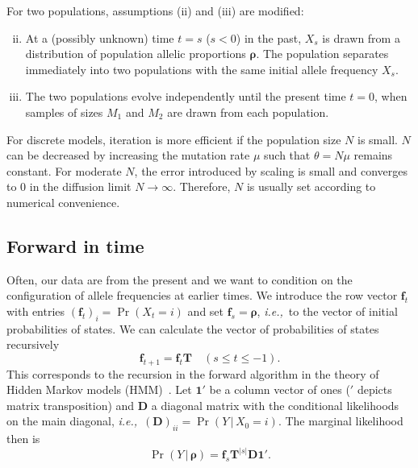 \documentclass[preprint]{elsarticle}
\newcommand{\bs}[1]{\ensuremath{\boldsymbol{#1}}}
\newcommand\given{{\,|\,}}
\newcommand\eg{{\it e.g.,}}
\newcommand\ie{{\it i.e.,}}
\newcommand\x[1]{\ensuremath{X_{#1}}}
\newcommand\y{\ensuremath{Y}}
\newcommand\s{\ensuremath{s}}
\newcommand\fv[1]{\ensuremath{\mathbf{f}_{#1}}}
\newcommand\oneC{\ensuremath{\mathbf{1}'}}
\begin{document}
For two populations, assumptions (ii) and (iii) are modified:
\begin{enumerate}[(i)]
\setcounter{enumi}{1}
\item At a (possibly unknown) time $t=\s$ ($\s<0$) in the past,  $\x{\s}$ is drawn from a distribution of population allelic proportions $\bs{\rho}$. The population separates immediately into two populations with the same initial allele frequency $\x{\s}$. 
\item The two populations evolve independently until the present time $t=0$, when samples of sizes $M_1$ and $M_2$ are drawn from each population.
\end{enumerate}

For discrete models, iteration is more efficient if the population size $N$ is small. $N$ can be decreased by increasing the mutation rate $\mu$ such that $\theta=N \mu$ remains constant. For moderate $N$, the error introduced by scaling is small and converges to $0$ in the diffusion limit $N \to \infty$. Therefore, $N$ is usually set according to numerical convenience. %


\subsection{Forward in time}

Often, our data are from the present and we want to condition on the configuration of allele frequencies at earlier times.  We introduce the row vector $\fv{t}$ with entries $(\fv{t})_{i} = \Pr(X_{t} = i)$ and set $\fv{\s} = \bs{\rho}$, \ie\ to the vector of initial probabilities of states. We can calculate the vector of probabilities of states recursively 
\begin{equation}
\fv{t+1} = \fv{t}\mathbf{T} \quad (\s \le t \le -1).
\end{equation}
This corresponds to the recursion in the forward algorithm in the theory of Hidden Markov models (HMM)~\citep[\eg][]{Vogl10}. Let $\oneC$ be a column vector of ones ($'$ depicts matrix transposition) and $\mathbf{D}$ a diagonal matrix with the conditional likelihoods on the main diagonal, \ie\ $(\mathbf{D})_{ii}=\Pr(\y \given \x{0}=i)$. The marginal likelihood then is
\begin{equation}
\Pr(\y \given \bs{\rho}) = \fv{\s}\mathbf{T}^{|\s|}\mathbf{D}\oneC.
\end{equation}
\end{document}
